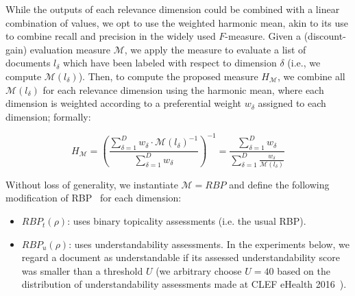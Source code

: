 While the outputs of each relevance dimension could be combined with a linear combination of values, we opt to use the weighted harmonic mean, akin to its use to combine recall and precision in the widely used $F$-measure. 
Given a (discount-gain) evaluation measure $\mathcal{M}$, we apply the measure to evaluate a list of  documents $l_\delta$ which have been labeled with respect to dimension $\delta$ (i.e., we compute $\mathcal{M}(l_\delta)$). Then, to compute the proposed measure $H_\mathcal{M}$, we combine all $\mathcal{M}(l_\delta)$ for each relevance dimension using the harmonic mean, where each dimension is weighted according to a preferential weight $w_\delta$ assigned to each dimension; formally:


\begin{equation}
    H_\mathcal{M}  = \left( \frac{\sum\limits_{\delta=1}^D w_\delta \cdot \mathcal{M}(l_\delta)^{-1}}{\sum\limits_{\delta=1}^D w_\delta} \right)^{-1}
          = \frac{\sum\limits_{\delta=1}^D w_\delta}{\sum\limits_{\delta=1}^D \frac{w_\delta}{\mathcal{M}(l_\delta)}}
\label{eq:H}
\end{equation}

%
%
%


%
Without loss of generality, we instantiate $\mathcal{M} = RBP$ and define the following modification of RBP~\cite{moffat08} for each dimension:
%
\begin{itemize}[leftmargin=*]
	\item $RBP_t(\rho)$: uses binary topicality assessments (i.e. the usual RBP). 
%	
    \item $RBP_u(\rho)$: uses understandability assessments. In the experiments below, we regard a document as understandable if its assessed understandability score was smaller than a threshold $U$ (we arbitrary choose $U = 40$ based on the distribution of understandability assessments made at CLEF eHealth 2016~\cite{clefIR16}).
\end{itemize}

